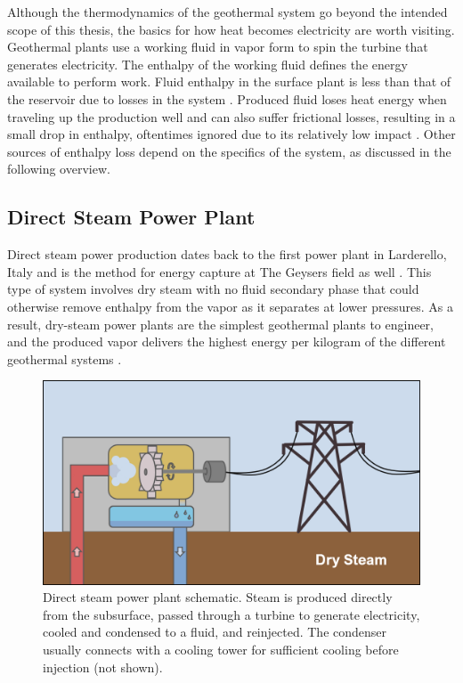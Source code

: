Although the thermodynamics of the geothermal system go beyond the intended scope of this thesis, the basics for how heat becomes electricity are worth visiting. Geothermal plants use a working fluid in vapor form to spin the turbine that generates electricity. The enthalpy of the working fluid defines the energy available to perform work. Fluid enthalpy in the surface plant is less than that of the reservoir due to losses in the system \citep[p.\ 204]{glassley_geothermal_2015}. Produced fluid loses heat energy when traveling up the production well and can also suffer frictional losses, resulting in a small drop in enthalpy, oftentimes ignored due to its relatively low impact \citep[p.\ 204]{glassley_geothermal_2015}. Other sources of enthalpy loss depend on the specifics of the system, as discussed in the following overview.

\subsection{Direct Steam Power Plant}\label{ch2:steam_plant}
Direct steam power production dates back to the first power plant in Larderello, Italy and is the method for energy capture at The Geysers field as well \citep[p.\ 131-132]{dipippo_geothermal_2012}. This type of system involves dry steam with no fluid secondary phase that could otherwise remove enthalpy from the vapor as it separates at lower pressures. As a result, dry-steam power plants are the simplest geothermal plants to engineer, and the produced vapor delivers the highest energy per kilogram of the different geothermal systems \citep[p.\ 205]{glassley_geothermal_2015}.  

\begin{figure}
\centering
\includegraphics[width=.9\textwidth]{templates/images/Figure-SteamPlant_Schematic.png}
\caption[Direct steam power plant schematic]{Direct steam power plant schematic. Steam is produced directly from the subsurface, passed through a turbine to generate electricity, cooled and condensed to a fluid, and reinjected. The condenser usually connects with a cooling tower for sufficient cooling before injection (not shown).}
\label{fig:steam_plant}
\end{figure}

